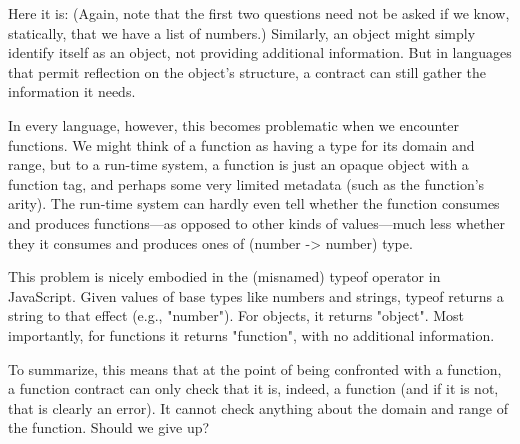 
Here it is:
(Again, note that the first two questions need not be asked if we know,
statically, that we have a list of numbers.) Similarly, an object might simply
identify itself as an object, not providing additional information. But in
languages that permit reflection on the object’s structure, a contract can still
gather the information it needs.

In every language, however, this becomes problematic when we encounter
functions. We might think of a function as having a type for its domain and
range, but to a run-time system, a function is just an opaque object with a
function tag, and perhaps some very limited metadata (such as the function’s
arity). The run-time system can hardly even tell whether the function consumes
and produces functions—as opposed to other kinds of values—much less whether
they it consumes and produces ones of (number -> number) type.

This problem is nicely embodied in the (misnamed) typeof operator in JavaScript.
Given values of base types like numbers and strings, typeof returns a string to
that effect (e.g., "number"). For objects, it returns "object". Most
importantly, for functions it returns "function", with no additional
information.

To summarize, this means that at the point of being confronted with a function,
a function contract can only check that it is, indeed, a function (and if it is
not, that is clearly an error). It cannot check anything about the domain and
range of the function.
Should we give up?
